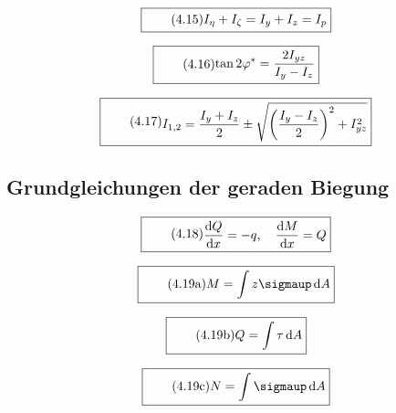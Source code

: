 \documentclass[11pt]{article}
\newcommand{\1}{ {\mathds{1}} }
\newcommand{\td}{\,\text{d}}
\renewcommand{\sigma  }{\sigmaup   }
\begin{document}
		\begin{equation}
			\boxed{
				\tag{4.15}
				\begin{split}
					I_{\eta} + I_{\zeta} = I_y + I_z = I_p
				\end{split}
			}
		\end{equation}

		\begin{equation}
			\boxed{
				\tag{4.16}
				\begin{split}
					\tan{2\varphi^*} = \frac{2 I_{yz}}{I_y - I_z}
				\end{split}
			}
		\end{equation}

		\begin{equation}
			\boxed{
				\tag{4.17}
				\begin{split}
					I_{1,2} = \frac{I_y + I_z}{2}
					\pm
					\sqrt{\left(\frac{I_y - I_z}{2}\right)^2 + I_{yz}^2}		
				\end{split}
			}
		\end{equation}
		
		\subsection{Grundgleichungen der geraden Biegung}

		\begin{equation}
			\boxed{
				\tag{4.18}
				\begin{split}
					\frac{\text{d}Q}{\text{d}x} = -q,\quad \frac{\text{d}M}{\text{d}x} = Q
				\end{split}
			}
		\end{equation}

		\begin{equation}
			\boxed{
				\tag{4.19a}
				\begin{split}
					M = \int z \sigma \td A
				\end{split}
			}
		\end{equation}


		\begin{equation}
			\boxed{
				\tag{4.19b}
				\begin{split}
					Q = \int \tau \td A
				\end{split}
			}
		\end{equation}

		\begin{equation}
			\boxed{
				\tag{4.19c}
				\begin{split}
					N = \int \sigma \td A
				\end{split}
			}
		\end{equation}
\end{document}
